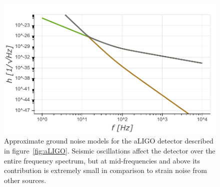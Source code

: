 \documentclass{article}
\begin{document}
	\begin{figure}[htb]
		\centering
		\includegraphics[height=0.35\textwidth]{SPQ_ground.pdf}
		\caption{Approximate ground noise models for the aLIGO detector
			described in figure~\ref{fig:aLIGO}. Seismic oscillations affect
			the detector over the entire frequency spectrum, but at
			mid-frequencies and above its contribution is extremely small in
			comparison to strain noise from other sources.}
		\label{fig:ground}
	\end{figure}
\end{document}
